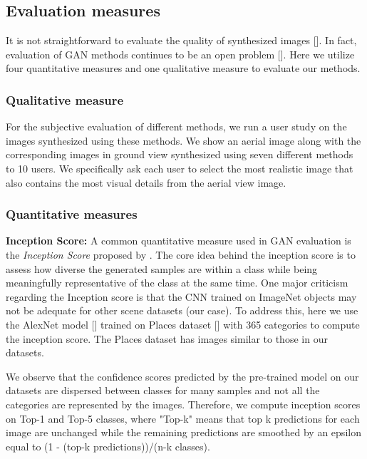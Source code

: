 \documentclass[times,twocolumn,final,authoryear]{elsarticle_modified}
\begin{document}
\vspace{-10pt}

\subsection{Evaluation measures} 
It is not straightforward to evaluate the quality of synthesized images [\cite{borji2018pros}]. In fact, evaluation of GAN methods continues to be an open problem [\cite{Theis2016a}]. Here we utilize four quantitative measures and one qualitative measure to evaluate our methods. 

\vspace{-5pt}

\subsubsection{Qualitative measure}
For the subjective evaluation of different methods, we run a user study on the images synthesized using these methods. We show an aerial image along with the corresponding images in ground view synthesized using seven different methods to 10 users. We specifically ask each user to select the most realistic image that also contains the most visual details from the aerial view image. 


\vspace{-5pt}

\subsubsection{Quantitative measures}
\noindent \textbf{Inception Score:}
A common quantitative measure used in GAN evaluation is the \textit{Inception Score}
proposed by \cite{DBLP:conf/nips/SalimansGZCRCC16}. 
The core idea behind the inception score is to assess how diverse the generated samples are within a class while being meaningfully representative of the class at the same time. One major criticism regarding the Inception score is that the CNN trained on ImageNet objects may not be adequate for other scene datasets (our case). To address this, here we use the AlexNet model [\cite{DBLP:journals/cacm/KrizhevskySH17}] trained on Places dataset [\cite{zhou2017places}] with 365 categories to compute the inception score. The Places dataset has images similar to those in our datasets. 

We observe that the confidence scores predicted by the pre-trained model on our datasets are dispersed between classes for many samples and not all the categories are represented by the images. Therefore, we compute inception scores on Top-1 and Top-5 classes, where "Top-k" means that top k predictions for each image are unchanged while the remaining predictions are smoothed by an epsilon equal to (1 - (top-k predictions))/(n-k classes). 
\end{document}
